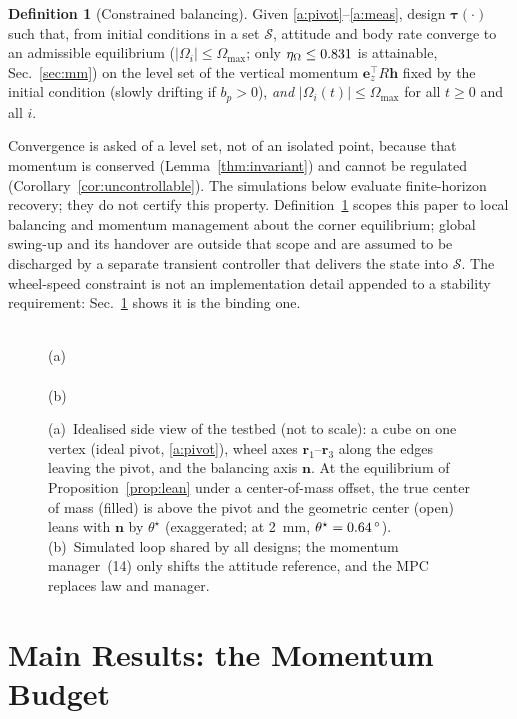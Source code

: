 \documentclass[conference]{IEEEtran}
\theoremstyle{definition}
\newtheorem{definition}{Definition}
\theoremstyle{plain}
\newcommand{\btau}{\boldsymbol{\tau}}
\newcommand{\bh}{\boldsymbol{h}}
\newcommand{\bre}{\boldsymbol{r}}
\begin{document}
\begin{definition}[Constrained balancing]
\label{def:objective}
Given \ref{a:pivot}--\ref{a:meas}, design $\btau(\cdot)$ such that, from
initial conditions in a set $\mathcal{S}$, attitude and body rate converge to
an admissible equilibrium ($|\Omega_i|\le\Omega_{\max}$; only
$\eta_\Omega\le0.831$ is attainable, Sec.~\ref{sec:mm}) on the level set of
the vertical momentum $\boldsymbol{e}_z^{\!\top}R\bh$ fixed by the initial
condition (slowly drifting if $b_p>0$), \emph{and}
$|\Omega_i(t)|\le\Omega_{\max}$ for all $t\ge0$ and all $i$.
\end{definition}

Convergence is asked of a level set, not of an isolated point, because that
momentum is conserved (Lemma~\ref{thm:invariant}) and cannot be regulated
(Corollary~\ref{cor:uncontrollable}). The simulations below evaluate
finite-horizon recovery; they do not certify this property.
Definition~\ref{def:objective} scopes this paper to local balancing and
momentum management about the corner equilibrium; global swing-up and its
handover are outside that scope and are assumed to be discharged by a separate
transient controller that delivers the state into $\mathcal{S}$. The wheel-speed
constraint is not an implementation detail appended to a stability requirement:
Sec.~\ref{sec:budget} shows it is the binding one.


\begin{figure}[t]
\centering
\\[-1pt]
{\footnotesize (a)}\\[2pt]
\\[-1pt]
{\footnotesize (b)}
\caption{(a)~Idealised side view of the testbed (not to scale): a cube on one
vertex (ideal pivot, \ref{a:pivot}), wheel axes $\bre_1$--$\bre_3$ along the
edges leaving the pivot, and the balancing axis $\boldsymbol n$. At the
equilibrium of Proposition~\ref{prop:lean} under a center-of-mass offset, the
true center of mass (filled) is above the pivot and the geometric center
(open) leans with $\boldsymbol n$ by $\theta^\star$ (exaggerated; at
\SI{2}{\milli\metre}, $\theta^\star=0.64\,\si{\degree}$). (b)~Simulated
loop shared by all designs; the momentum manager~(14) only shifts the attitude
reference, and the MPC replaces law and manager.}
\label{fig:system}
\end{figure}

\section{Main Results: the Momentum Budget}
\label{sec:budget}
\end{document}
